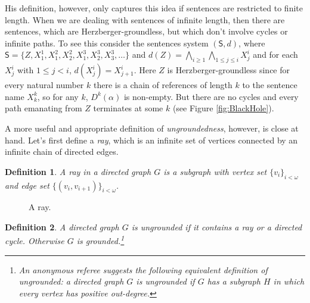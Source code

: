 \documentclass[12pt]{kluwer}
\newtheorem{defn}{Definition}
\theoremstyle{remark}
\newcommand{\prg}{\hspace{0.25in}}
\def\S{\textsf{S}}
\begin{document}
His definition, however, only captures this idea if sentences are restricted to finite length. When we are dealing with sentences of infinite length, then there are sentences, which are Herzberger-groundless, but which don't involve cycles or infinite paths. To see this consider the sentences system $(\S,d)$, where $\S = \{Z, X^1_1, X^2_1, X^2_2, X^3_1, X^3_2, X^3_3, \dots\}$ and $d(Z) = \bigwedge_{i \geq 1} \bigwedge_{1 \leq j \leq i} X^i_j$ and for each $X^i_j$ with $1 \leq j < i$, $d(X^i_j) = X^i_{j+1}$. Here $Z$ is Herzberger-groundless since for every natural number $k$ there is a chain of references of length $k$ to the sentence name $X^k_k$, so for any $k$, $D^k(\alpha)$ is non-empty. But there are no cycles and every path emanating from $Z$ terminates at some $k$ (see Figure \ref{fig:BlackHole}).

\prg A more useful and appropriate definition of \textit{ungroundedness}, however, is close at hand. Let's first define a \textit{ray}, which is an infinite  set of vertices connected by an infinite chain of directed edges.

\begin{defn}
A \emph{ray} in a directed graph $G$ is a subgraph with vertex set $\{v_i\}_{i < \omega}$ and edge set $\{(v_i, v_{i + 1})\}_{i < \omega}$.
\end{defn}

\begin{figure}[h]
\centering
{}
\caption{A ray.}
\label{fig:ray}
\end{figure}

\begin{defn}
A directed graph $G$ is \emph{ungrounded} if it contains a ray or a directed cycle.  Otherwise $G$ is \emph{grounded}.\footnote{An anonymous referee suggests the following equivalent definition of ungrounded: a directed graph $G$ is \emph{ungrounded} if $G$ has a subgraph $H$ in which every vertex has positive out-degree.}
\end{defn}
\end{document}
